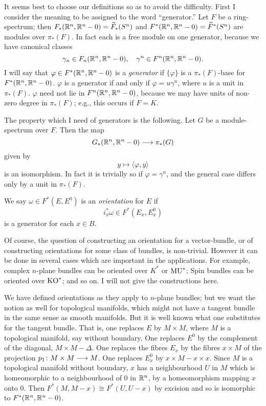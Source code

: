 \documentclass[../main]{subfiles}
\begin{document}
It seems best to choose our definitions so as to avoid the difficulty. First I consider the meaning to be assigned to the word ``generator.'' Let $F$ be a ring-spectrum; then $F_*(\mathbb{R}^n,\mathbb{R}^n-0) = \widetilde{F}_*(S^n)$ and $F^*(\mathbb{R}^n,\mathbb{R}^n-0) = \widetilde{F}^*(S^n)$ are modules over $\pi_*(F)$. In fact each is a free module on one generator, because we have canonical classes
\[
	\gamma_n \in F_n(\mathbb{R}^n,\mathbb{R}^n-0), \quad \gamma^n \in F^n(\mathbb{R}^n, \mathbb{R}^n - 0).
\]
I will say that $\varphi \in F^*(\mathbb{R}^n,\mathbb{R}^n-0)$ is a \emph{generator}  if $\{\varphi\}$ is a $\pi_*(F)$-base for $F^*(\mathbb{R}^n,\mathbb{R}^n-0)$. $\varphi$ is a generator if and only if $\varphi = u \gamma^n$, where $u$ is a unit in $\pi_*(F)$. $\varphi$ need not lie in $F^n(\mathbb{R}^n,\mathbb{R}^n-0)$, because we may have units of non-zero degree in $\pi_*(F)$; e.g., this occurs if $F=K$.

The property which I need of generators is the following. Let $G$ be a module-spectrum over $F$. Then the map \[G_*(\mathbb{R}^n,\mathbb{R}^n-0) \longrightarrow \pi_*(G)\]
given by 
\[y \mapsto  \langle \varphi , y \rangle\]
is an isomorphism. In fact it is trivially so if $\varphi = \gamma^n$, and the general case differs only by a unit in $\pi_*(F)$.

We say $\omega \in  F^*(E,E^0)$ is an \emph{orientation}  for $E$ if
\[i_x^* \omega \in F^*(E_x,E_x^0)\]
is a generator for each $x \in B$.

Of course, the question of constructing an orientation for a vector-bundle, or of constructing orientations for some class of bundles, is non-trivial. However it can be done in several cases which are important in the applications. For example, complex $n$-plane bundles can be oriented over $K^*$ or $\mathrm{MU}^*$; Spin bundles can be oriented over $\mathrm{KO}^*$; and so on. I will not give the constructions here.

We have defined orientations as they apply to $n$-plane bundles; but we want the notion as well for topological manifolds, which might not have a tangent bundle in the same sense as smooth manifolds. But it is well known what one substitutes for the tangent bundle. That is, one replaces $E$ by $M \times M$, where $M$ is a topological manifold, say without boundary. One replaces $E^0$ by the complement of the diagonal, $M \times M - \Delta$. One replaces the fibres $E_x$ by the fibres $x \times M$ of the projection $p_1 \colon M \times M \longrightarrow M$. One replaces $E^0_x$ by $x \times M - x \times x$. Since $M$ is a topological manifold without boundary, $x$ has a neighbourhood $U$ in $M$ which is homeomorphic to a neighbourhood of 0 in $\mathbb{R}^n$, by a homeomorphism mapping $x$ onto 0. Then $F^*(M,M-x) \cong F^*(U,U-x)$ by excision and so is isomorphic to $F^*(\mathbb{R}^n,\mathbb{R}^n - 0)$.
\end{document}
